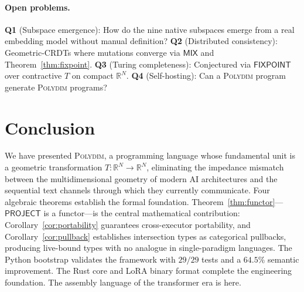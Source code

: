 \documentclass[10pt,twocolumn]{article}
\theoremstyle{plain}
\theoremstyle{definition}
\theoremstyle{remark}
\newcommand{\RR}{\mathbb{R}}
\newcommand{\Mix}{\mathsf{MIX}}
\newcommand{\Fixpoint}{\mathsf{FIXPOINT}}
\newcommand{\Project}{\mathsf{PROJECT}}
\begin{document}
\paragraph{Open problems.}
\textbf{Q1} (Subspace emergence): How do the nine native subspaces emerge from
a real embedding model without manual definition? \textbf{Q2} (Distributed
consistency): Geometric-CRDTs where mutations converge via $\Mix$ and
Theorem~\ref{thm:fixpoint}. \textbf{Q3} (Turing completeness): Conjectured via
$\Fixpoint$ over contractive $T$ on compact $\RR^N$. \textbf{Q4} (Self-hosting):
Can a \textsc{Polydim} program generate \textsc{Polydim} programs?

\section{Conclusion}
\label{sec:conclusion}

We have presented \textsc{Polydim}, a programming language whose fundamental
unit is a geometric transformation $T\colon \RR^N \to \RR^N$, eliminating the
impedance mismatch between the multidimensional geometry of modern AI
architectures and the sequential text channels through which they currently
communicate. Four algebraic theorems establish the formal foundation.
Theorem~\ref{thm:functor}---$\Project$ is a functor---is the central
mathematical contribution: Corollary~\ref{cor:portability} guarantees
cross-executor portability, and Corollary~\ref{cor:pullback} establishes
intersection types as categorical pullbacks, producing live-bound types with no
analogue in single-paradigm languages. The Python bootstrap validates the
framework with $29/29$ tests and a $64.5\%$ semantic improvement. The Rust core
and LoRA binary format complete the engineering foundation. The assembly language
of the transformer era is here.



\end{document}
